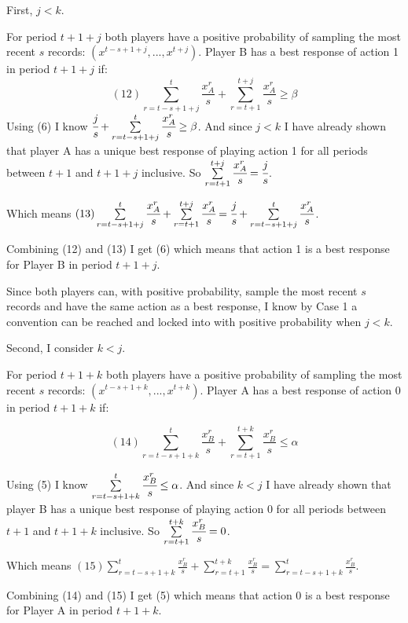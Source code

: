 \documentclass{article}
\begin{document}
\vskip12pt

First, $j<k$. 

\vskip6pt

For period $t+1+j$ both players have a positive probability of sampling the most recent $s$ records: $(x^{t-s+1+j},...,x^{t+j})$. Player B has a best response of action 1 in period $t+1+j$ if:
$$(12) \sum\limits_{r=t-s+1+j}^{t}\frac{x^r_A}{s}+\sum\limits_{r=t+1}^{t+j} \frac{x^r_A}{s} \geq \beta$$
Using (6) I know $\cfrac{j}{s}+\sum\limits_{r=t-s+1+j}^{t}\cfrac{x^r_A}{s} \geq \beta$. And since $j<k$ I have already shown that player A has a unique best response of playing action 1 for all periods between $t+1$ and $t+1+j$ inclusive. So $\sum\limits_{r=t+1}^{t+j} \cfrac{x^r_A}{s}=\cfrac{j}{s}$.

Which means $(13) \sum\limits_{r=t-s+1+j}^{t}\cfrac{x^r_A}{s}+\sum\limits_{r=t+1}^{t+j} \cfrac{x^r_A}{s}=\cfrac{j}{s}+\sum\limits_{r=t-s+1+j}^{t}\cfrac{x^r_A}{s}$.

Combining (12) and (13) I get (6) which means that action 1 is a best response for Player B in period $t+1+j$.

\vskip6pt

Since both players can, with positive probability, sample the most recent $s$ records and have the same action as a best response, I know by Case 1 a convention can be reached and locked into with positive probability when $j<k$.

\vskip18pt

Second, I consider $k<j$.

\vskip6pt

For period $t+1+k$ both players have a positive probability of sampling the most recent $s$ records: $(x^{t-s+1+k},...,x^{t+k})$. Player A has a best response of action 0 in period $t+1+k$ if:

$$(14) \sum\limits_{r=t-s+1+k}^{t}\frac{x^r_B}{s}+\sum\limits_{r=t+1}^{t+k} \frac{x^r_B}{s} \leq \alpha$$

Using (5) I know $\sum\limits_{r=t-s+1+k}^{t}\cfrac{x^r_B}{s} \leq \alpha$. And since $k<j$ I have already shown that player B has a unique best response of playing action 0 for all periods between $t+1$ and $t+1+k$ inclusive. So $\sum\limits_{r=t+1}^{t+k} \cfrac{x^r_B}{s}=0$.

Which means $(15) \sum\limits_{r=t-s+1+k}^{t}\frac{x^r_B}{s}+\sum\limits_{r=t+1}^{t+k} \frac{x^r_B}{s}=\sum\limits_{r=t-s+1+k}^{t}\frac{x^r_B}{s}$.

Combining (14) and (15) I get (5) which means that action 0 is a best response for Player A in period $t+1+k$.
\end{document}
